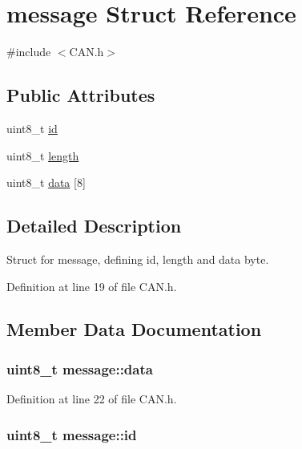 \hypertarget{structmessage}{}\section{message Struct Reference}
\label{structmessage}


{\ttfamily \#include $<$C\+A\+N.\+h$>$}

\subsection*{Public Attributes}
\begin{DoxyCompactItemize}
\item 
uint8\+\_\+t \hyperlink{structmessage_ab45746bda3c3c16b71d13dc15b86dff1}{id}
\item 
uint8\+\_\+t \hyperlink{structmessage_a4990637e6cbd0a7afc3e57c1d6a74eeb}{length}
\item 
uint8\+\_\+t \hyperlink{structmessage_aef003837686b3fdd72c7a6fa54b0e483}{data} \mbox{[}8\mbox{]}
\end{DoxyCompactItemize}


\subsection{Detailed Description}
Struct for message, defining id, length and data byte. 

Definition at line 19 of file C\+A\+N.\+h.



\subsection{Member Data Documentation}
\subsubsection[{\texorpdfstring{data}{data}}]{\setlength{\rightskip}{0pt plus 5cm}uint8\+\_\+t message\+::data}\hypertarget{structmessage_aef003837686b3fdd72c7a6fa54b0e483}{}\label{structmessage_aef003837686b3fdd72c7a6fa54b0e483}


Definition at line 22 of file C\+A\+N.\+h.

\subsubsection[{\texorpdfstring{id}{id}}]{\setlength{\rightskip}{0pt plus 5cm}uint8\+\_\+t message\+::id}\hypertarget{structmessage_ab45746bda3c3c16b71d13dc15b86dff1}{}\label{structmessage_ab45746bda3c3c16b71d13dc15b86dff1}


